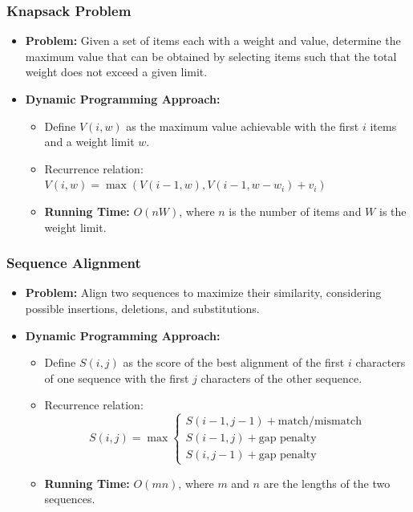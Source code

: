 \documentclass[8pt]{article}
\begin{document}
\subsubsection*{Knapsack Problem}
\begin{itemize}
    \item \textbf{Problem:} Given a set of items each with a weight and value, determine the maximum value that can be obtained by selecting items such that the total weight does not exceed a given limit.
    \item \textbf{Dynamic Programming Approach:}
    \begin{itemize}
        \item Define \(V(i, w)\) as the maximum value achievable with the first \(i\) items and a weight limit \(w\).
        \item Recurrence relation: \(V(i, w) = \max(V(i-1, w), V(i-1, w-w_i) + v_i)\)
        \item \textbf{Running Time:} \(O(nW)\), where \(n\) is the number of items and \(W\) is the weight limit.
    \end{itemize}
\end{itemize}

\subsubsection*{Sequence Alignment}
\begin{itemize}
    \item \textbf{Problem:} Align two sequences to maximize their similarity, considering possible insertions, deletions, and substitutions.
    \item \textbf{Dynamic Programming Approach:}
    \begin{itemize}
        \item Define \(S(i, j)\) as the score of the best alignment of the first \(i\) characters of one sequence with the first \(j\) characters of the other sequence.
        \item Recurrence relation: 
        \[
        S(i, j) = \max \begin{cases} 
            S(i-1, j-1) + \text{match/mismatch} \\
            S(i-1, j) + \text{gap penalty} \\
            S(i, j-1) + \text{gap penalty} 
        \end{cases}
        \]
        \item \textbf{Running Time:} \(O(mn)\), where \(m\) and \(n\) are the lengths of the two sequences.
    \end{itemize}
\end{itemize}
\end{document}
